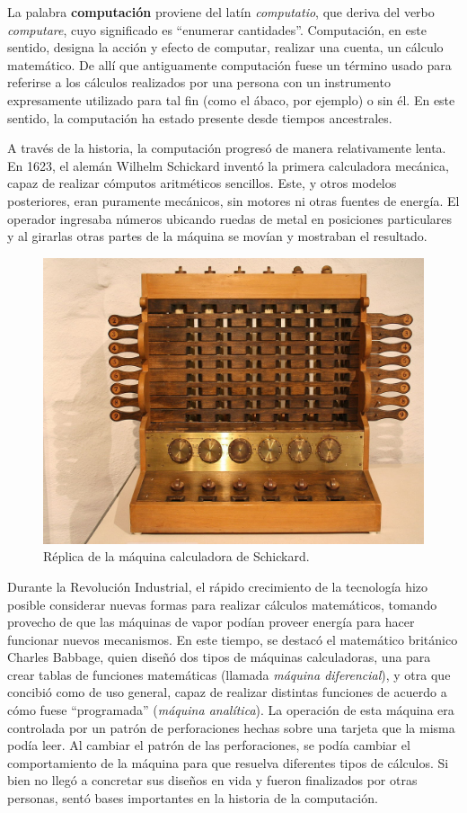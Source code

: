 \documentclass[]{book}
\begin{document}
La palabra \textbf{computación} proviene del latín \emph{computatio}, que deriva del verbo \emph{computare}, cuyo significado es ``enumerar cantidades''. Computación, en este sentido, designa la acción y efecto de computar, realizar una cuenta, un cálculo matemático. De allí que antiguamente computación fuese un término usado para referirse a los cálculos realizados por una persona con un instrumento expresamente utilizado para tal fin (como el ábaco, por ejemplo) o sin él. En este sentido, la computación ha estado presente desde tiempos ancestrales.

A través de la historia, la computación progresó de manera relativamente lenta. En 1623, el alemán Wilhelm Schickard inventó la primera calculadora mecánica, capaz de realizar cómputos aritméticos sencillos. Este, y otros modelos posteriores, eran puramente mecánicos, sin motores ni otras fuentes de energía. El operador ingresaba números ubicando ruedas de metal en posiciones particulares y al girarlas otras partes de la máquina se movían y mostraban el resultado.

\begin{figure}

{\centering \includegraphics[width=0.5\linewidth]{images/01_calculadora} 

}

\caption{Réplica de la máquina calculadora de Schickard.}\label{fig:calculadora}
\end{figure}

Durante la Revolución Industrial, el rápido crecimiento de la tecnología hizo posible considerar nuevas formas para realizar cálculos matemáticos, tomando provecho de que las máquinas de vapor podían proveer energía para hacer funcionar nuevos mecanismos. En este tiempo, se destacó el matemático británico Charles Babbage, quien diseñó dos tipos de máquinas calculadoras, una para crear tablas de funciones matemáticas (llamada \emph{máquina diferencial}), y otra que concibió como de uso general, capaz de realizar distintas funciones de acuerdo a cómo fuese ``programada'' (\emph{máquina analítica}). La operación de esta máquina era controlada por un patrón de perforaciones hechas sobre una tarjeta que la misma podía leer. Al cambiar el patrón de las perforaciones, se podía cambiar el comportamiento de la máquina para que resuelva diferentes tipos de cálculos. Si bien no llegó a concretar sus diseños en vida y fueron finalizados por otras personas, sentó bases importantes en la historia de la computación.
\end{document}
